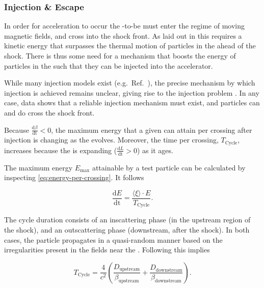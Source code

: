 \subsubsection{Injection \& Escape}
\label{sssec:snr-injection-and-escape}

In order for acceleration to occur the \CR-to-be must enter the regime of 
moving magnetic fields, and cross into the shock front. As laid out in 
\cite{baloghPhysicsCollisionlessShocks2013} this requires a kinetic energy that
surpasses the thermal motion of particles in the \ISM ahead of the shock. There
is thus some need for a mechanism that boosts the energy of particles in the 
\ISM such that they can be injected into the accelerator.

While many injection models exist (e.g.\ Ref.\ 
\cite{galeevInjectionMechanismCosmic1989}), the precise mechanism by which 
injection is achieved remains unclear, giving rise to the injection problem 
\cite{baloghPhysicsCollisionlessShocks2013}. In any case, data shows that a 
reliable injection mechanism must exist, and particles can and do cross the 
shock front. 

Because $\frac{\mathrm{d}\beta}{\mathrm{dt}}<0$, the maximum energy that a 
given \CR can attain per crossing after injection is changing as the \SNR 
evolves. Moreover, the time per crossing, $T_\mathrm{Cycle}$, increases because
the \SNR is expanding ($\frac{\mathrm{d}L}{\mathrm{dt}}>0$) as it ages.

The maximum energy $E_\mathrm{max}$ attainable by a test particle can be
calculated by inspecting \cref{eq:energy-per-crossing}. It follows

\begin{equation}
\label{eq:energy-budget}
\frac{\mathrm{d}E}{\mathrm{dt}} = \frac{\langle\xi\rangle\cdot E}{T_\mathrm{Cycle}}.
\end{equation}

The cycle duration consists of an inscattering phase (in the upstream region of
the shock), and an outscattering phase (downstream, after the shock). In both 
cases, the particle propagates in a quasi-random manner based on the 
irregularities present in the \EM fields near the \SNR. Following 
\cite{lagageMaximumEnergyCosmic1983} this implies

\begin{equation}
\label{eq:snr-cycle}
T_\mathrm{Cycle} = \frac{4}{c^2} \left( \frac{D_\mathrm{upstream}}{\beta_\mathrm{upstream}} + \frac{D_\mathrm{downstream}}{\beta_\mathrm{downstream}} \right).
\end{equation}

